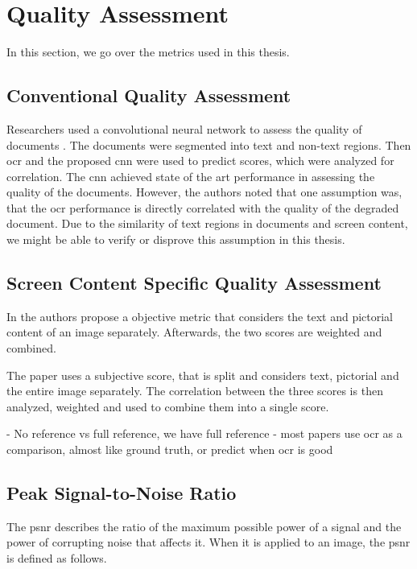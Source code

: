 \chapter{Quality Assessment}
\label{chap:qualityassessment}

In this section, we go over the metrics used in this thesis.

\section{Conventional Quality Assessment}

Researchers used a convolutional neural network to assess the quality of documents \cite{ocr_cnn_docu_2014}.
The documents were segmented into text and non-text regions.
Then \gls{ocr} and the proposed \gls{cnn} were used to predict scores, which were analyzed for correlation.
The \gls{cnn} achieved state of the art performance in assessing the quality of the documents.
However, the authors noted that one assumption was, that the \gls{ocr} performance is directly correlated with the quality of the degraded document.
Due to the similarity of text regions in documents and screen content, we might be able to verify or disprove this assumption in this thesis.

\section{Screen Content Specific Quality Assessment}

In \cite{text_pict_weight_2017} the authors propose a objective metric that considers the text and pictorial content of an image separately.
Afterwards, the two scores are weighted and combined.

The paper \cite{3_subj_weight_2015} uses a subjective score, that is split and considers text, pictorial and the entire image separately.
The correlation between the three scores is then analyzed, weighted and used to combine them into a single score.

- No reference vs full reference, we have full reference
- most papers use ocr as a comparison, almost like ground truth, or predict when ocr is good


\section{Peak Signal-to-Noise Ratio}
\label{subsec:psnr}

The \gls{psnr} \cite{PSNRvsSSIM_2010} describes the ratio of the maximum possible power of a signal and the power of corrupting noise that affects it.
When it is applied to an image, the \gls{psnr} is defined as follows.

